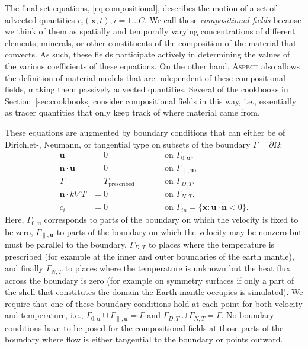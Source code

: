 \documentclass{article}
\newcommand{\aspect}{\textsc{Aspect}}
\begin{document}
The final set equations, \eqref{eq:compositional}, describes the motion of
a set of advected quantities $c_i(\mathbf x,t),i=1\ldots C$. We call these
\textit{compositional fields} because we think of them as spatially and
temporally varying concentrations of different elements, minerals, or other
constituents of the composition of the material that convects. As such, these
fields participate actively in determining the values of the various
coefficients of these equations. On the other hand, \aspect{} also allows the
definition of material models that are independent of these compositional
fields, making them passively advected quantities. Several of the cookbooks in
Section~\ref{sec:cookbooks} consider compositional fields in this way, i.e.,
essentially as tracer quantities that only keep track of where material came
from.

These equations are
augmented by boundary conditions that can either be of Dirichlet-, Neumann, or
tangential type on subsets of the boundary $\Gamma=\partial\Omega$:
\begin{align}
  \mathbf u &= 0 & \qquad &\textrm{on $\Gamma_{0,\mathbf u}$},
  \\
  \mathbf n \cdot \mathbf u &= 0 & \qquad &\textrm{on $\Gamma_{\parallel,\mathbf u}$},
  \\
  T &= T_{\text{prescribed}}
   & \qquad &\textrm{on $\Gamma_{D,T}$},
  \\
  \mathbf n \cdot k\nabla T &= 0
   & \qquad &\textrm{on $\Gamma_{N,T}$}.
  \\
  c_i &= 0
   & \qquad &\textrm{on $\Gamma_\textit{in}=\{\mathbf x: \mathbf
   u\cdot\mathbf n<0\}$}.
\end{align}
Here,
$\Gamma_{0,\mathbf u}$ corresponds to parts of the boundary on which the
velocity is fixed to be zero,
$\Gamma_{\parallel,\mathbf u}$ to parts of the boundary on which the
velocity may be nonzero but must be parallel to the boundary,
$\Gamma_{D,T}$ to places where the temperature is prescribed (for example at
the inner and outer boundaries of the earth mantle), and finally
$\Gamma_{N,T}$ to places where the temperature is unknown but the heat flux
across the boundary is zero (for example on symmetry surfaces if only a part
of the shell that constitutes the domain the Earth mantle occupies is
simulated). We require that one of these boundary conditions hold at each
point for both velocity and temperature, i.e.,
$\Gamma_{0,\mathbf u}\cup\Gamma_{\parallel,\mathbf u}=\Gamma$ and
$\Gamma_{D,T}\cup\Gamma_{N,T}=\Gamma$. No boundary conditions have to be posed
for the compositional fields at those parts of the boundary where flow is either
tangential to the boundary or points outward.
\end{document}
